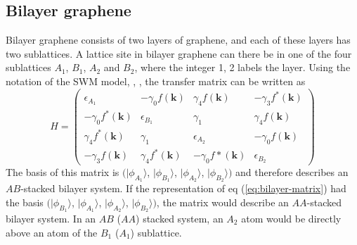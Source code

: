 \subsection{Bilayer graphene}
Bilayer graphene consists of two layers of graphene, and each of these layers has two sublattices. A lattice site in bilayer graphene can there be in one of the four sublattices $A_1$, $B_1$, $A_2$ and $B_2$, where the integer 1, 2 labels the layer. Using the notation of the SWM model, \cite{McClure1957}, \cite{McClure1960}, the transfer matrix can be written as
\begin{equation}
H =  \begin{pmatrix} \epsilon_{A_1} & - \gamma_0 f \left( \mathbf{k} \right) & \gamma_4 f \left( \mathbf{k} \right) & - \gamma_3 f^*\left( \mathbf{k} \right) \\
- \gamma_0 f^* \left( \mathbf{k} \right) & \epsilon_{B_1} & \gamma_1 & \gamma_4 f \left( \mathbf{k} \right) \\
\gamma_4 f^* \left( \mathbf{k} \right) & \gamma_1 & \epsilon_{A_2} & - \gamma_0 f \left( \mathbf{k} \right)  \\
- \gamma_3 f \left( \mathbf{k} \right) & \gamma_4 f^* \left( \mathbf{k} \right)& -\gamma_0 f* \left( \mathbf{k} \right)& \epsilon_{B_2} \end{pmatrix} \label{eq:bilayer-matrix}
\end{equation}
The basis  of this matrix is  $( |\phi_{A_1}\rangle$, $|\phi_{B_1}\rangle$, $|\phi_{A_2}\rangle$, $|\phi_{B_2}\rangle )$ and therefore describes an $AB$-stacked bilayer system. If the representation of eq (\ref{eq:bilayer-matrix}) had the basis $( |\phi_{B_1}\rangle$, $|\phi_{A_1}\rangle$, $|\phi_{A_2}\rangle$, $|\phi_{B_2}\rangle )$, the matrix would describe an $AA$-stacked bilayer system. %
In an $AB$ ($AA$) stacked system, an $A_2$ atom would be directly above an atom of the $B_1$ ($A_1$) sublattice.

